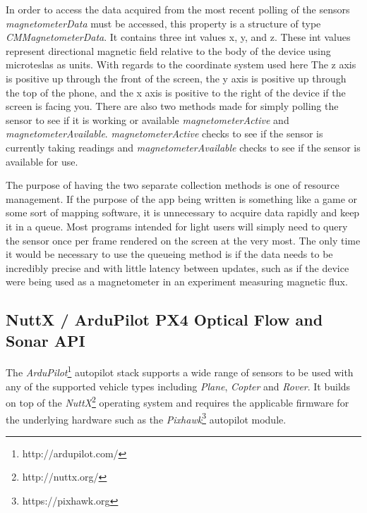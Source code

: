 \documentclass[paper=letter, fontsize=11pt]{scrartcl}
\numberwithin{equation}{section}
\numberwithin{figure}{section}
\numberwithin{table}{section}
\begin{document}
\par
In order to access the data acquired from the most recent polling of the sensors {\em
magnetometerData} must be accessed, this property is a structure of type
{\em CMMagnetometerData}. It contains three int values x, y, and z. These int
values represent directional magnetic field relative to the body of the device
using microteslas as units. With regards to the coordinate system used here The z
axis is positive up through the front of the screen, the y axis is positive up
through the top of the phone, and the x axis is positive to the right of the device
if the screen is facing you. There are also two methods made for simply polling the
sensor to see if it is working or available {\em magnetometerActive} and 
{\em magnetometerAvailable}. {\em magnetometerActive} checks to see if the sensor
is currently taking readings and {\em magnetometerAvailable} checks to see if the sensor is
available for use.

\par
The purpose of having the two separate collection methods is one of resource
management. If the purpose of the app being written is something like a game or
some sort of mapping software, it is unnecessary to acquire data rapidly and
keep it in a queue. Most programs intended for light users will simply need to
query the sensor once per frame rendered on the screen at the very most. The
only time it would be necessary to use the queueing method is if the data needs to be incredibly
precise and with little latency between updates, such as if the device were
being used as a magnetometer in an experiment measuring magnetic flux.

\subsection{NuttX / ArduPilot PX4 Optical Flow and Sonar API}
\label{ardupilot_flow_api}
\lstset{language=C++}
\par
The {\em ArduPilot}\footnote{http://ardupilot.com/} autopilot stack supports a
wide range of sensors to be used with any of the supported vehicle types
including {\em Plane}, {\em Copter} and {\em Rover}. It builds on top of the
{\em NuttX}\footnote{http://nuttx.org/} operating system and requires the
applicable firmware for the underlying hardware such as the
{\em Pixhawk}\footnote{https://pixhawk.org} autopilot module.
\end{document}
